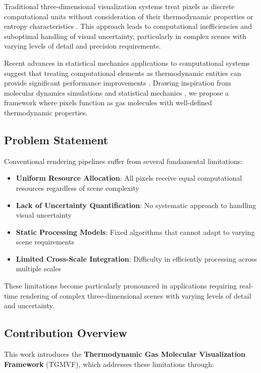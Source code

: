 \documentclass[12pt,a4paper]{article}
\begin{document}
Traditional three-dimensional visualization systems treat pixels as discrete computational units without consideration of their thermodynamic properties or entropy characteristics \cite{foley1995computer, akenine2019real}. This approach leads to computational inefficiencies and suboptimal handling of visual uncertainty, particularly in complex scenes with varying levels of detail and precision requirements.

Recent advances in statistical mechanics applications to computational systems suggest that treating computational elements as thermodynamic entities can provide significant performance improvements \cite{landauer1961irreversibility, bennett1982thermodynamics}. Drawing inspiration from molecular dynamics simulations \cite{allen2017computer} and statistical mechanics \cite{chandler1987introduction}, we propose a framework where pixels function as gas molecules with well-defined thermodynamic properties.

\subsection{Problem Statement}

Conventional rendering pipelines suffer from several fundamental limitations:

\begin{itemize}
\item \textbf{Uniform Resource Allocation}: All pixels receive equal computational resources regardless of scene complexity
\item \textbf{Lack of Uncertainty Quantification}: No systematic approach to handling visual uncertainty
\item \textbf{Static Processing Models}: Fixed algorithms that cannot adapt to varying scene requirements
\item \textbf{Limited Cross-Scale Integration}: Difficulty in efficiently processing across multiple scales
\end{itemize}

These limitations become particularly pronounced in applications requiring real-time rendering of complex three-dimensional scenes with varying levels of detail and uncertainty.

\subsection{Contribution Overview}

This work introduces the \textbf{Thermodynamic Gas Molecular Visualization Framework} (TGMVF), which addresses these limitations through:
\end{document}
